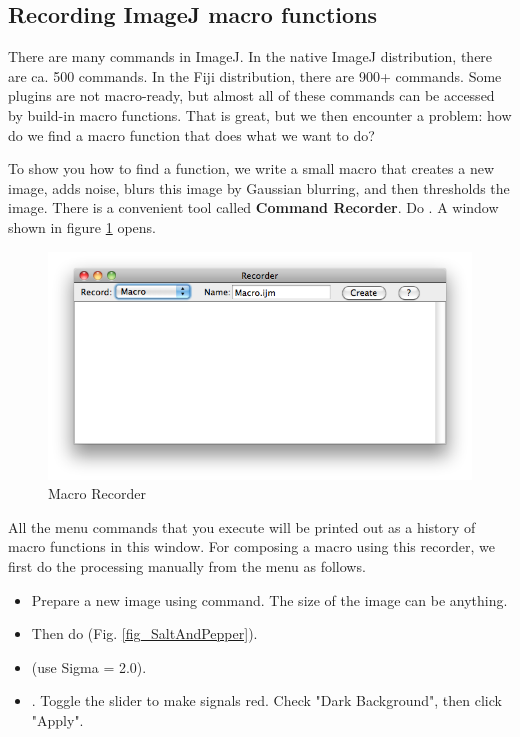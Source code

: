 \subsection{Recording ImageJ macro functions}
There are many commands in ImageJ. In the native ImageJ distribution, there are ca. 500 commands. In the Fiji distribution, there are 900+ commands. Some plugins are not macro-ready, but almost all of these commands can be accessed by build-in macro functions. That is great, but we then encounter a problem: how do we find a macro function that does what we want to do?

To show you how to find a function, we write a small macro that creates a new image, adds noise, blurs this image by Gaussian blurring, and then thresholds the image. There is a convenient tool called \textbf{Command Recorder}. 
Do . A window shown in figure
\ref{fig_macroRecorderBlank} opens.

\begin{figure}[htbp]
\begin{center}
\includegraphics[scale=0.6]{fig/MacroRecorderBlank.png}
\caption{Macro Recorder} \label{fig_macroRecorderBlank}
\end{center}
\end{figure}

All the menu commands that you execute will be printed out as a history of macro functions in this window. For composing a macro using this recorder, we first do the processing manually from the menu as follows. 
\begin{itemize}
  \item Prepare a new image using  command. The size of the image can be anything.
  \item Then do  (Fig.
  \ref{fig_SaltAndPepper}).
  \item {} (use Sigma = 2.0).
  \item {}. Toggle the slider to make
  signals red. Check "Dark Background", then click "Apply".
\end{itemize}
 
